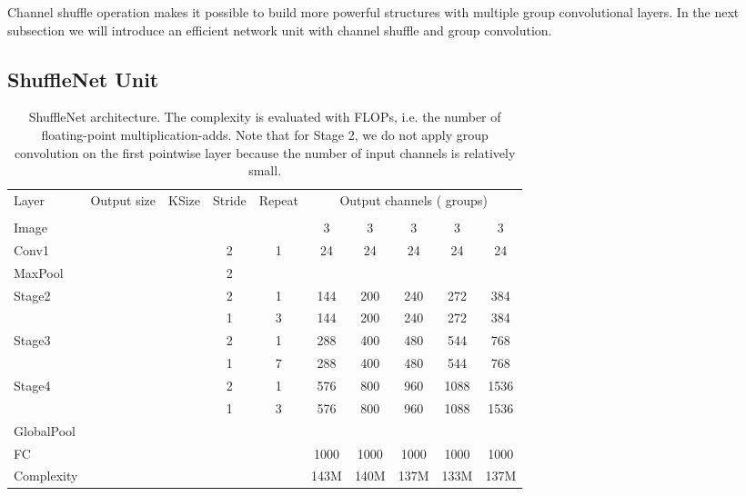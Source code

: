 \documentclass[10pt,twocolumn,letterpaper]{article}
\begin{document}
Channel shuffle operation makes it possible to build more powerful structures with multiple group convolutional layers. In the next subsection we will introduce an efficient network unit with channel shuffle and group convolution.


\subsection{ShuffleNet Unit}
\label{sec:unit}

\begin{table*}[ht]
	\begin{center}
		\begin{tabular}{l|c|c|c|c|ccccc}
			\hline
			Layer & Output size & KSize & Stride & Repeat & \multicolumn{5}{c}{Output channels ( groups)} \\
& & & & &  &  &  &  &  \\
			\hline \hline
			Image &  & & & & 3 & 3 & 3 & 3 & 3 \\
			\hline
			Conv1 &  &  & 2 & 1 & 24 & 24 & 24 & 24 & 24 \\
			MaxPool &  &  & 2 &  &  &  &  &  &  \\
			\hline
			Stage2 &  & & 2 & 1 & 144 & 200 & 240 & 272 & 384 \\
			&  & & 1 & 3 & 144 & 200 & 240 & 272 & 384 \\
			\hline
			Stage3 &  & & 2 & 1 & 288 & 400 & 480 & 544 & 768 \\
			&  & & 1 & 7 & 288 & 400 & 480 & 544 & 768 \\
			\hline
			Stage4 &  & & 2 & 1 & 576 & 800 & 960 & 1088 & 1536 \\
			&  & & 1 & 3 & 576 & 800 & 960 & 1088 & 1536 \\
			\hline
			GlobalPool &  &  & & & & & & & \\ 
			\hline
			FC & & & & & 1000 & 1000 & 1000 & 1000 & 1000 \\
			\hline \hline
			Complexity & & & & & 143M & 140M & 137M & 133M & 137M \\
			\hline
		\end{tabular}
	\end{center}
	\caption{ShuffleNet architecture. The complexity is evaluated with FLOPs, i.e. the number of floating-point multiplication-adds. Note that for Stage 2, we do not apply group convolution on the first pointwise layer because the number of input channels is relatively small.}
	\label{tbl:arch}
\end{table*}
\end{document}
